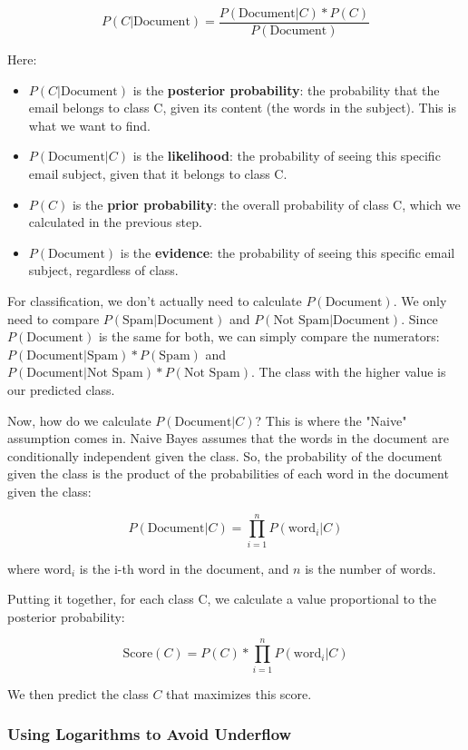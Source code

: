 \documentclass[12pt,a4paper]{article}
\begin{document}
\[P(C | \text{Document}) = \frac{P(\text{Document} | C) * P(C)}{P(\text{Document})}\]

Here:
\begin{itemize}
    \item $P(C | \text{Document})$ is the \textbf{posterior probability}: the probability that the email belongs to class C, given its content (the words in the subject). This is what we want to find.
    \item $P(\text{Document} | C)$ is the \textbf{likelihood}: the probability of seeing this specific email subject, given that it belongs to class C.
    \item $P(C)$ is the \textbf{prior probability}: the overall probability of class C, which we calculated in the previous step.
    \item $P(\text{Document})$ is the \textbf{evidence}: the probability of seeing this specific email subject, regardless of class.
\end{itemize}

For classification, we don't actually need to calculate $P(\text{Document})$. We only need to compare $P(\text{Spam} | \text{Document})$ and $P(\text{Not Spam} | \text{Document})$. Since $P(\text{Document})$ is the same for both, we can simply compare the numerators: $P(\text{Document} | \text{Spam}) * P(\text{Spam})$ and $P(\text{Document} | \text{Not Spam}) * P(\text{Not Spam})$. The class with the higher value is our predicted class.

Now, how do we calculate $P(\text{Document} | C)$? This is where the "Naive" assumption comes in. Naive Bayes assumes that the words in the document are conditionally independent given the class. So, the probability of the document given the class is the product of the probabilities of each word in the document given the class:

\[P(\text{Document} | C) = \prod_{i=1}^{n} P(\text{word}_i | C)\]

where $\text{word}_i$ is the i-th word in the document, and $n$ is the number of words.

Putting it together, for each class C, we calculate a value proportional to the posterior probability:

\[\text{Score}(C) = P(C) * \prod_{i=1}^{n} P(\text{word}_i | C)\]

We then predict the class $C$ that maximizes this score.

\subsubsection{Using Logarithms to Avoid Underflow}
\end{document}
